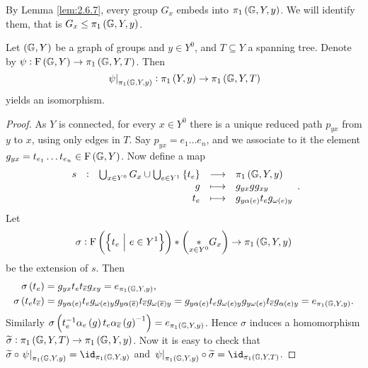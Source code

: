 \pagebreak


\begin{corollary}
By Lemma \ref{lem:2.6.7}, every group $ G_x $ embeds into $ \pi_1\br{\GG, Y, y} $. We will identify them, that is $ G_x \le \pi_1\br{\GG, Y, y} $.
\end{corollary}

\begin{lemma}
Let $ \br{\GG, Y} $ be a graph of groups and $ y \in Y^0 $, and $ T \subseteq Y $ a spanning tree. Denote by $ \psi : \F\br{\GG, Y} \to \pi_1\br{\GG, Y, T} $. Then
$$ \eval{\psi}_{\pi_1\br{\GG, Y, y}} : \pi_1\br{Y, y} \to \pi_1\br{\GG, Y, T} $$
yields an isomorphism.
\end{lemma}

\begin{proof}
As $ Y $ is connected, for every $ x \in Y^0 $ there is a unique reduced path $ p_{yx} $ from $ y $ to $ x $, using only edges in $ T $. Say $ p_{yx} = e_1 \dots e_n $, and we associate to it the element $ g_{yx} = t_{e_1} \dots t_{e_n} \in \F\br{\GG, Y} $. Now define a map
$$
\begin{array}{ccrcl}
s & : & \bigcup_{x \in Y^0} G_x \cup \bigcup_{e \in Y^1} \cbr{t_e} & \longrightarrow & \pi_1\br{\GG, Y, y} \\
& & g & \longmapsto & g_{yx}gg_{xy} \\
& & t_e & \longmapsto & g_{y\alpha\br{e}}t_eg_{\omega\br{e}y}
\end{array}.
$$
Let
$$ \sigma : \F\br{\cbr{t_e \st e \in Y^1}} * \br{\underset{x \in Y^0}{*} G_x} \to \pi_1\br{\GG, Y, y} $$
be the extension of $ s $. Then
\begin{align*}
\sigma\br{t_e} & = g_{yx}t_et_{\overline{e}}g_{xy} = e_{\pi_1\br{\GG, Y, y}}, \\
\sigma\br{t_et_{\overline{e}}} & = g_{y\alpha\br{e}}t_eg_{\omega\br{e}y}g_{y\alpha\br{\overline{e}}}t_{\overline{e}}g_{\omega\br{\overline{e}}y} = g_{y\alpha\br{e}}t_eg_{\omega\br{e}y}g_{y\omega\br{e}}t_{\overline{e}}g_{\alpha\br{e}y} = e_{\pi_1\br{\GG, Y, y}}.
\end{align*}
Similarly $ \sigma\br{t_e^{-1}\alpha_e\br{g}t_e\alpha_{\overline{e}}\br{g}^{-1}} = e_{\pi_1\br{\GG, Y, y}} $. Hence $ \sigma $ induces a homomorphism $ \widetilde{\sigma} : \pi_1\br{\GG, Y, T} \to \pi_1\br{\GG, Y, y} $. Now it is easy to check that $ \widetilde{\sigma} \circ \eval{\psi}_{\pi_1\br{\GG, Y, y}} = \id_{\pi_1\br{\GG, Y, y}} $ and $ \eval{\psi}_{\pi_1\br{\GG, Y, y}} \circ \widetilde{\sigma} = \id_{\pi_1\br{\GG, Y, T}} $.
\end{proof}

